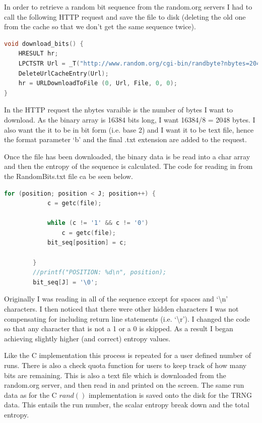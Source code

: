 \documentclass[a4paper,10.5pt]{article}
\begin{document}
In order to retrieve a random bit sequence from the random.org servers I had to call the following HTTP request and save the file to disk (deleting the old one from the cache so that we don't get the same sequence twice).

\begin{lstlisting}[language=C]
void download_bits() {
	HRESULT hr;
	LPCTSTR Url = _T("http://www.random.org/cgi-bin/randbyte?nbytes=2048&format=b.txt"), File = _T("RandomBits.txt");
	DeleteUrlCacheEntry(Url);
	hr = URLDownloadToFile (0, Url, File, 0, 0);
}
\end{lstlisting}

In the HTTP request the nbytes varaible is the number of bytes I want to download. As the binary array is 16384 bits long, I want 16384/8 = 2048 bytes. I also want the it to be in bit form (i.e. base 2) and I want it to be text file, hence the format parameter `b' and the final .txt extension are added to the request. 

Once the file has been downloaded, the binary data is be read into a char array and then the entropy of the sequence is calculated. The code for reading in from the RandomBits.txt file ca be seen below. 

\begin{lstlisting}[language=C]
for (position; position < J; position++) {
			c = getc(file);

			while (c != '1' && c != '0')
				c = getc(file);
			bit_seq[position] = c;

		}
		//printf("POSITION: %d\n", position);
		bit_seq[J] = '\0';
\end{lstlisting}

Originally I was reading in all of the sequence except for spaces and `\textbackslash n' characters. I then noticed that there were other hidden characters I was not compensating for including return line statements (i.e. `\textbackslash r'). I changed the code so that any character that is not a 1 or a 0 is skipped. As a result I began achieving slightly higher (and correct) entropy values.

Like the C implementation this process is repeated for a user defined number of runs. There is also a check quota function for users to keep track of how many bits are remaining. This is also a text file which is downloaded from the random.org server, and then read in and printed on the screen. The same run data as for the C $rand()$ implementation is saved onto the disk for the TRNG data. This entails the run number, the scalar entropy break down and the total entropy.
\end{document}
